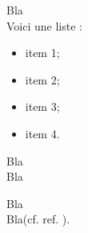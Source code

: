 Bla\\

Voici une liste :
\begin{itemize}
\item item 1;
\item item 2;
\item item 3;
\item item 4.
\end{itemize}

Bla\\

Bla

Bla\footnotemark\\

Bla(cf. ref. \cite{cite6}).

